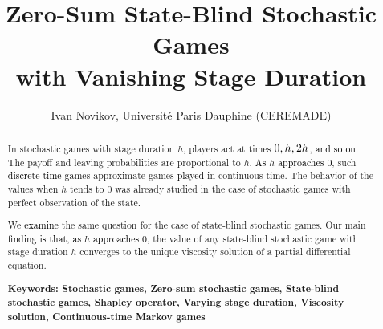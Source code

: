 \documentclass[english,openary,12pt]{article}
\newcommand{\red}[1]{\textcolor{black}{#1}}
\newcommand{\brown}[1]{\textcolor{black}{#1}}
\theoremstyle{definition}
\begin{document}
\setlength{\abovedisplayskip}{5pt}
\setlength{\belowdisplayskip}{5pt}
\setlength\abovedisplayshortskip{5pt}
\setlength\belowdisplayshortskip{5pt}

\author{Ivan Novikov, Université Paris Dauphine (CEREMADE)}
\title{\vspace{-2.1cm} Zero-Sum State-Blind Stochastic Games \\with Vanishing
Stage Duration
\vspace{-0.42cm}}
\date{}

\maketitle

\vspace{-1.8cm}

\begin{abstract}
In stochastic games with stage duration $h$, players act at times $\red{0}, h, 2h$, \brown{and so on.} The payoff and leaving probabilities are proportional to $h$. \brown{As $h$ approaches $0$}, such \brown{discrete-time} games approximate games \brown{played} in continuous time. The behavior of the values when $h$ tends to $0$ was already studied in the case of stochastic games with perfect observation of the state. 

We \brown{examine} the same question for the case of state-blind stochastic games. Our main \brown{finding is that, as $h$ approaches $0$,} the value of any state-blind stochastic game with stage duration $h$ converges to \red{the} unique viscosity solution of a partial differential equation.

\vspace{1cm}

\textbf{Keywords: Stochastic games, Zero-sum stochastic games, 
State-blind stochastic games, Shapley operator, Varying stage duration, 
Viscosity solution, Continuous-time Markov games}
\end{abstract}

\vspace{1cm}

\tableofcontents

\newpage
\end{document}
